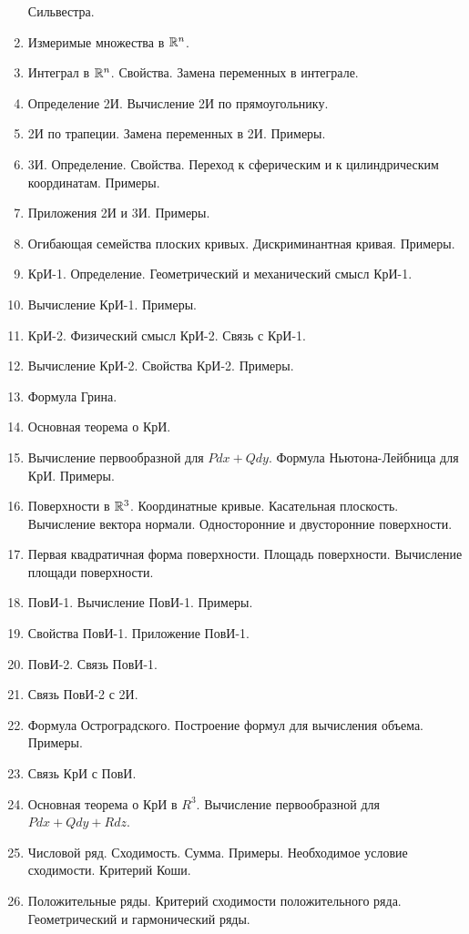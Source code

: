 \documentclass[../main.tex]{subfiles}
\begin{document}
\begin{enumerate}
  Сильвестра.
  \item Измеримые множества в $\mathbb{R}^n$.
  \item Интеграл в $\mathbb{R}^n$. Свойства. Замена переменных в интеграле.
  \item Определение 2И.  Вычисление 2И по прямоугольнику.
  \item 2И по трапеции. Замена переменных в 2И. Примеры.
  \item 3И. Определение. Свойства. Переход к сферическим и к цилиндрическим 
  координатам. Примеры.
  \item Приложения 2И и 3И. Примеры.
  \item Огибающая семейства плоских кривых. Дискриминантная кривая. Примеры.
  \item КрИ-1. Определение. Геометрический и механический смысл КрИ-1.
  \item Вычисление КрИ-1. Примеры.
  \item КрИ-2. Физический смысл КрИ-2. Связь с КрИ-1.
  \item Вычисление КрИ-2. Свойства КрИ-2. Примеры.
  \item Формула Грина.
  \item Основная теорема о КрИ.
  \item Вычисление первообразной для $Pdx+Qdy$. Формула Ньютона-Лейбница для 
  КрИ. Примеры.
  \item Поверхности в $\mathbb{R}^3$. Координатные кривые. Касательная плоскость. 
  Вычисление вектора нормали. Односторонние и двусторонние поверхности.
  \item Первая квадратичная форма поверхности. Площадь поверхности. Вычисление 
  площади поверхности.
  \item ПовИ-1. Вычисление ПовИ-1. Примеры.
  \item Свойства ПовИ-1. Приложение ПовИ-1.
  \item ПовИ-2. Связь ПовИ-1.
  \item Связь ПовИ-2 с 2И.
  \item Формула Остроградского. Построение формул для вычисления объема. 
  Примеры.
  \item Связь КрИ с ПовИ.
  \item Основная теорема о КрИ в $R^3$. Вычисление первообразной для 
  $Pdx+Qdy+Rdz$.
  \item Числовой ряд. Сходимость. Сумма. Примеры. Необходимое условие 
  сходимости. Критерий Коши.
  \item Положительные ряды. Критерий сходимости положительного ряда. 
  Геометрический и гармонический ряды.

\end{enumerate}
\end{document}

